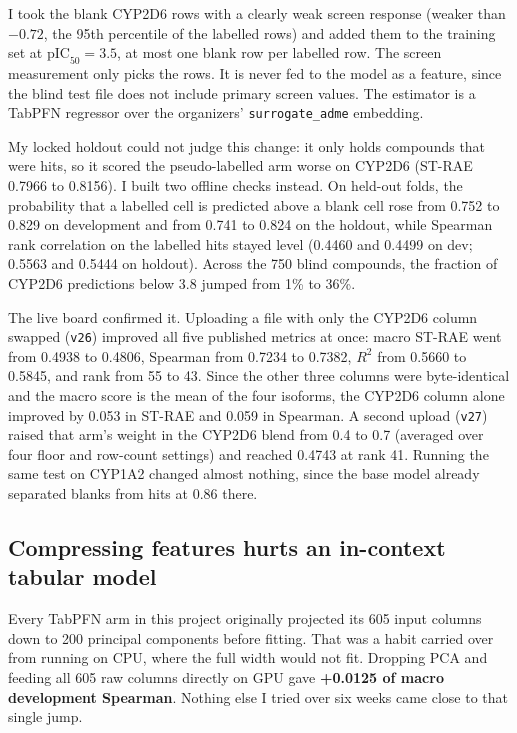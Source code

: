 \documentclass[11pt]{article}
\begin{document}
I took the blank CYP2D6 rows with a clearly weak screen response (weaker than $-0.72$, the 95th percentile of the labelled rows) and added them to the training set at $\text{pIC}_{50} = 3.5$, at most one blank row per labelled row. The screen measurement only picks the rows. It is never fed to the model as a feature, since the blind test file does not include primary screen values. The estimator is a TabPFN regressor over the organizers' \texttt{surrogate\_adme} embedding.

My locked holdout could not judge this change: it only holds compounds that were hits, so it scored the pseudo-labelled arm worse on CYP2D6 (ST-RAE 0.7966 to 0.8156). I built two offline checks instead. On held-out folds, the probability that a labelled cell is predicted above a blank cell rose from 0.752 to 0.829 on development and from 0.741 to 0.824 on the holdout, while Spearman rank correlation on the labelled hits stayed level (0.4460 and 0.4499 on dev; 0.5563 and 0.5444 on holdout). Across the 750 blind compounds, the fraction of CYP2D6 predictions below 3.8 jumped from 1\% to 36\%.

The live board confirmed it. Uploading a file with only the CYP2D6 column swapped (\texttt{v26}) improved all five published metrics at once: macro ST-RAE went from 0.4938 to 0.4806, Spearman from 0.7234 to 0.7382, $R^2$ from 0.5660 to 0.5845, and rank from 55 to 43. Since the other three columns were byte-identical and the macro score is the mean of the four isoforms, the CYP2D6 column alone improved by 0.053 in ST-RAE and 0.059 in Spearman. A second upload (\texttt{v27}) raised that arm's weight in the CYP2D6 blend from 0.4 to 0.7 (averaged over four floor and row-count settings) and reached 0.4743 at rank 41. Running the same test on CYP1A2 changed almost nothing, since the base model already separated blanks from hits at 0.86 there.

\subsection{Compressing features hurts an in-context tabular model}
Every TabPFN arm in this project originally projected its 605 input columns down to 200 principal components before fitting. That was a habit carried over from running on CPU, where the full width would not fit. Dropping PCA and feeding all 605 raw columns directly on GPU gave \textbf{+0.0125 of macro development Spearman}. Nothing else I tried over six weeks came close to that single jump.
\end{document}
